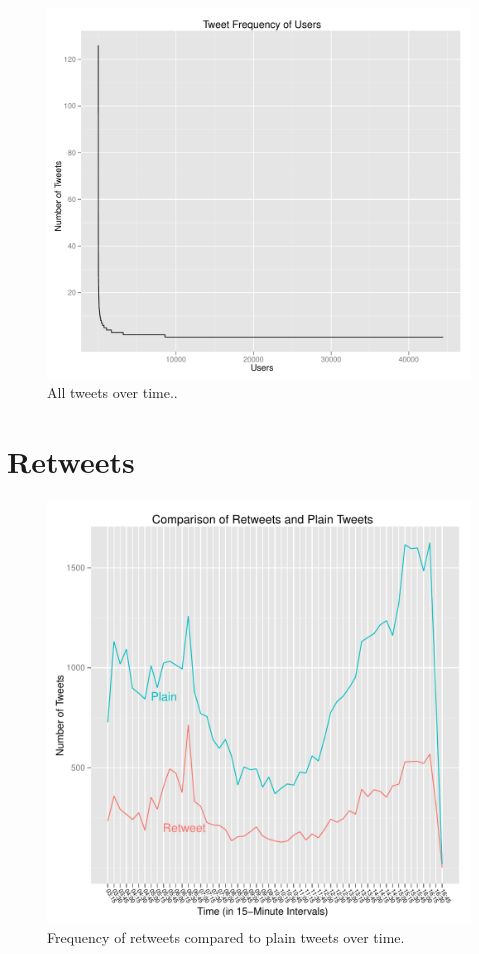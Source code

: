 \documentclass[a4paper, 11pt, titlepage]{article}
\begin{document}
\begin{figure}[h]
\centering
\label{fig:all_tweets_by_users}
\includegraphics[width=120mm]{../figures/all_tweets_by_users}
\caption{All tweets over time..}
\end{figure}

\section{Retweets}

\begin{figure}[h]
\centering
\label{fig:rt_compare_over_time}
\includegraphics[width=120mm]{../figures/rt_compare_over_time}
\caption{Frequency of retweets compared to plain tweets over time.}
\end{figure}
\end{document}
